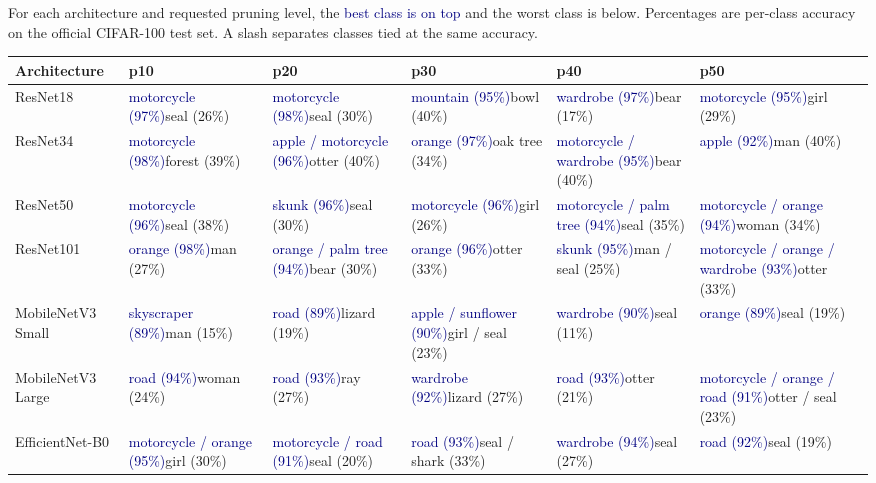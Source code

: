 For each architecture and requested pruning level, the \textcolor{navy}{best class is on top} and the worst class is below. Percentages are per-class accuracy on the official CIFAR-100 test set. A slash separates classes tied at the same accuracy.

{\small\setlength{\tabcolsep}{4pt}\renewcommand{\arraystretch}{1.12}
\newcommand{\classpair}[2]{\textcolor{navy}{#1}\newline #2}
\begin{tabularx}{\linewidth}{@{}l*{5}{>{\raggedright\arraybackslash}X}@{}}\toprule
Architecture & p10 & p20 & p30 & p40 & p50\\
\midrule
ResNet18 & \classpair{motorcycle (97\%)}{seal (26\%)} & \classpair{motorcycle (98\%)}{seal (30\%)} & \classpair{mountain (95\%)}{bowl (40\%)} & \classpair{wardrobe (97\%)}{bear (17\%)} & \classpair{motorcycle (95\%)}{girl (29\%)}\\
\addlinespace[3pt]
ResNet34 & \classpair{motorcycle (98\%)}{forest (39\%)} & \classpair{apple / motorcycle (96\%)}{otter (40\%)} & \classpair{orange (97\%)}{oak tree (34\%)} & \classpair{motorcycle / wardrobe (95\%)}{bear (40\%)} & \classpair{apple (92\%)}{man (40\%)}\\
\addlinespace[3pt]
ResNet50 & \classpair{motorcycle (96\%)}{seal (38\%)} & \classpair{skunk (96\%)}{seal (30\%)} & \classpair{motorcycle (96\%)}{girl (26\%)} & \classpair{motorcycle / palm tree (94\%)}{seal (35\%)} & \classpair{motorcycle / orange (94\%)}{woman (34\%)}\\
\addlinespace[3pt]
ResNet101 & \classpair{orange (98\%)}{man (27\%)} & \classpair{orange / palm tree (94\%)}{bear (30\%)} & \classpair{orange (96\%)}{otter (33\%)} & \classpair{skunk (95\%)}{man / seal (25\%)} & \classpair{motorcycle / orange / wardrobe (93\%)}{otter (33\%)}\\
\addlinespace[3pt]
MobileNetV3 Small & \classpair{skyscraper (89\%)}{man (15\%)} & \classpair{road (89\%)}{lizard (19\%)} & \classpair{apple / sunflower (90\%)}{girl / seal (23\%)} & \classpair{wardrobe (90\%)}{seal (11\%)} & \classpair{orange (89\%)}{seal (19\%)}\\
\addlinespace[3pt]
MobileNetV3 Large & \classpair{road (94\%)}{woman (24\%)} & \classpair{road (93\%)}{ray (27\%)} & \classpair{wardrobe (92\%)}{lizard (27\%)} & \classpair{road (93\%)}{otter (21\%)} & \classpair{motorcycle / orange / road (91\%)}{otter / seal (23\%)}\\
\addlinespace[3pt]
EfficientNet-B0 & \classpair{motorcycle / orange (95\%)}{girl (30\%)} & \classpair{motorcycle / road (91\%)}{seal (20\%)} & \classpair{road (93\%)}{seal / shark (33\%)} & \classpair{wardrobe (94\%)}{seal (27\%)} & \classpair{road (92\%)}{seal (19\%)}\\

\end{tabularx}}
